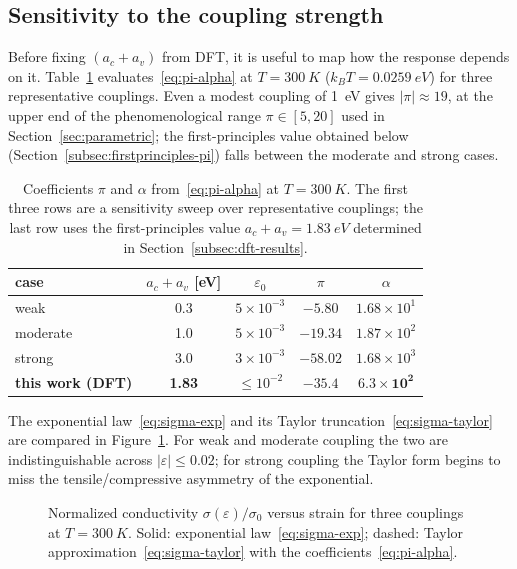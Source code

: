 \subsection{Sensitivity to the coupling strength}
\label{subsec:sensitivity}

Before fixing $(a_c+a_v)$ from DFT, it is useful to map how the response depends
on it. Table~\ref{tab:coupling-sweep} evaluates~\eqref{eq:pi-alpha} at
$T=\SI{300}{K}$ ($k_B T = \SI{0.0259}{eV}$) for three representative couplings.
Even a modest coupling of \SI{1}{eV} gives $|\pi|\approx19$, at the upper end of
the phenomenological range $\pi\in[5,20]$ used in Section~\ref{sec:parametric};
the first-principles value obtained below
(Section~\ref{subsec:firstprinciples-pi}) falls between the moderate and strong
cases.

\begin{table}[ht]
  \centering
  \begin{tabular}{lcccc}
    \toprule
    case & $a_c+a_v$ [eV] & $\varepsilon_0$ & $\pi$ & $\alpha$ \\
    \midrule
    weak     & 0.3 & $5\times10^{-3}$ & $-5.80$  & $1.68\times10^{1}$ \\
    moderate & 1.0 & $5\times10^{-3}$ & $-19.34$ & $1.87\times10^{2}$ \\
    strong   & 3.0 & $3\times10^{-3}$ & $-58.02$ & $1.68\times10^{3}$ \\
    \midrule
    \textbf{this work (DFT)} & \textbf{1.83} & $\le10^{-2}$ & $\mathbf{-35.4}$ & $\mathbf{6.3\times10^{2}}$ \\
    \bottomrule
  \end{tabular}
  \caption{Coefficients $\pi$ and $\alpha$ from~\eqref{eq:pi-alpha} at
  $T=\SI{300}{K}$. The first three rows are a sensitivity sweep over
  representative couplings; the last row uses the first-principles value
  $a_c+a_v=\SI{1.83}{eV}$ determined in Section~\ref{subsec:dft-results}.}
  \label{tab:coupling-sweep}
\end{table}

The exponential law~\eqref{eq:sigma-exp} and its Taylor
truncation~\eqref{eq:sigma-taylor} are compared in
Figure~\ref{fig:sigma-exp-taylor}. For weak and moderate coupling the two are
indistinguishable across $|\varepsilon|\le0.02$; for strong coupling the Taylor
form begins to miss the tensile/compressive asymmetry of the exponential.

\begin{figure}[ht]
  \centering
  \caption{Normalized conductivity $\sigma(\varepsilon)/\sigma_0$ versus strain
  for three couplings at $T=\SI{300}{K}$. Solid: exponential
  law~\eqref{eq:sigma-exp}; dashed: Taylor approximation~\eqref{eq:sigma-taylor}
  with the coefficients~\eqref{eq:pi-alpha}.}
  \label{fig:sigma-exp-taylor}
\end{figure}

